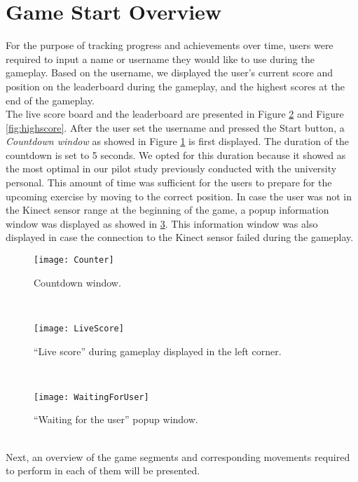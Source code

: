 \section{Game Start Overview}
For the purpose of tracking progress and achievements over time, users were required to input a name or username they would like to use during the gameplay. Based on the username, we displayed the user's current score and position on the leaderboard during the gameplay, and the highest scores at the end of the gameplay. \\The live score board and the leaderboard are presented in Figure \ref{fig:livescore} and Figure \ref{fig:highscore}. After the user set the username and pressed the Start button, a \textit{Countdown window} as showed in Figure \ref{fig:counter} is first displayed. The duration of the countdown is set to 5 seconds. We opted for this duration because it showed as the most optimal in our pilot study previously conducted with the university personal. This amount of time was sufficient for the users to prepare for the upcoming exercise by moving to the correct position. In case the user was not in the Kinect sensor range at the beginning of the game, a popup information window was displayed as showed in \ref{fig:waiting}. This information window was also displayed in case the connection to the Kinect sensor failed during the gameplay. \\
\begin{figure}[h]
    \centering
    \texttt{[image: Counter]}
    \caption{Countdown window.}
    \label{fig:counter}
\end{figure}\\
\begin{figure}[h]
    \centering
    \texttt{[image: LiveScore]}
    \caption{``Live score'' during gameplay displayed in the left corner.}
    \label{fig:livescore}
\end{figure}\\
\begin{figure}[h]
    \centering
    \texttt{[image: WaitingForUser]}
    \caption{``Waiting for the user'' popup window.}
    \label{fig:waiting}
\end{figure}\\
Next, an overview of the game segments and corresponding movements required to perform in each of them will be presented.
